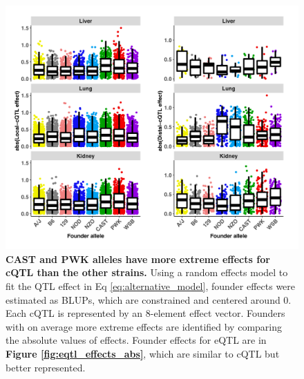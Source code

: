 \documentclass[9pt,twocolumn,twoside]{gsajnl}
\begin{document}
\begin{figure}[hp]
\renewcommand{\familydefault}{\sfdefault}\normalfont
\centering
\includegraphics[width=\textwidth, trim={0in 0in 0in 0in}, clip]{figs/all_cqtl_effects_abs.pdf}
\caption{\textbf{CAST and PWK alleles have more extreme effects for cQTL than the other strains.} Using a random effects model to fit the QTL effect in Eq \ref{eq:alternative_model}, founder effects were estimated as BLUPs, which are constrained and centered around 0. Each cQTL is represented by an 8-element effect vector. Founders with on average more extreme effects are identified by comparing the absolute values of effects. Founder effects for eQTL are in \textbf{Figure \ref{fig:eqtl_effects_abs}}, which are similar to cQTL but better represented.
\label{fig:cqtl_effects_abs}}
\end{figure}
\end{document}
